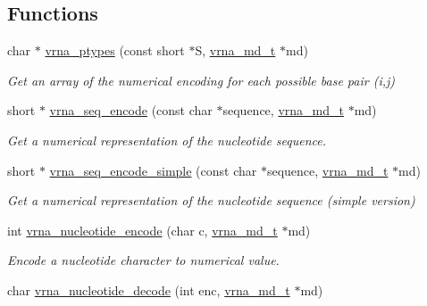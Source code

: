 \subsection*{Functions}
\begin{DoxyCompactItemize}
\item 
char $\ast$ \hyperlink{group__utils_ga51a9e86a5f731f5f2f5584ee67cee4a8}{vrna\+\_\+ptypes} (const short $\ast$S, \hyperlink{group__model__details_ga1f8a10e12a0a1915f2a4eff0b28ea17c}{vrna\+\_\+md\+\_\+t} $\ast$md)
\begin{DoxyCompactList}\small\item\em Get an array of the numerical encoding for each possible base pair (i,j) \end{DoxyCompactList}\item 
\mbox{\label{group__utils_ga636e7d6f888fd639587296a5eddea660}} 
short $\ast$ \hyperlink{group__utils_ga636e7d6f888fd639587296a5eddea660}{vrna\+\_\+seq\+\_\+encode} (const char $\ast$sequence, \hyperlink{group__model__details_ga1f8a10e12a0a1915f2a4eff0b28ea17c}{vrna\+\_\+md\+\_\+t} $\ast$md)
\begin{DoxyCompactList}\small\item\em Get a numerical representation of the nucleotide sequence. \end{DoxyCompactList}\item 
\mbox{\label{group__utils_ga3cd79d21d53248ad2634c1c0d43e97d7}} 
short $\ast$ \hyperlink{group__utils_ga3cd79d21d53248ad2634c1c0d43e97d7}{vrna\+\_\+seq\+\_\+encode\+\_\+simple} (const char $\ast$sequence, \hyperlink{group__model__details_ga1f8a10e12a0a1915f2a4eff0b28ea17c}{vrna\+\_\+md\+\_\+t} $\ast$md)
\begin{DoxyCompactList}\small\item\em Get a numerical representation of the nucleotide sequence (simple version) \end{DoxyCompactList}\item 
int \hyperlink{group__utils_gac12bf00123f88621c9be847b0879c1fb}{vrna\+\_\+nucleotide\+\_\+encode} (char c, \hyperlink{group__model__details_ga1f8a10e12a0a1915f2a4eff0b28ea17c}{vrna\+\_\+md\+\_\+t} $\ast$md)
\begin{DoxyCompactList}\small\item\em Encode a nucleotide character to numerical value. \end{DoxyCompactList}\item 
char \hyperlink{group__utils_ga48ef585e697be9c8a08ed68c655e29b6}{vrna\+\_\+nucleotide\+\_\+decode} (int enc, \hyperlink{group__model__details_ga1f8a10e12a0a1915f2a4eff0b28ea17c}{vrna\+\_\+md\+\_\+t} $\ast$md)

\end{DoxyCompactItemize}
